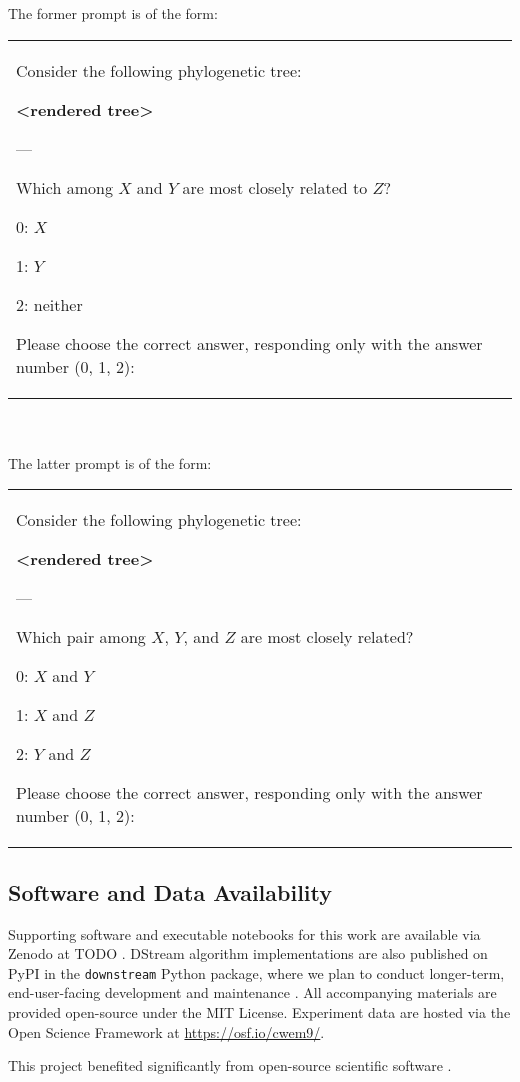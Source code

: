 The former prompt is of the form:

\begin{tabular}{|p{}}
Consider the following phylogenetic tree:

\textbf{<rendered tree>}

---

Which among $X$ and $Y$ are most closely related to $Z$?

0: $X$

1: $Y$

2: neither

Please choose the correct answer, responding only with the answer number (0, 1, 2):
\end{tabular}

~\\
~\\
The latter prompt is of the form:

\begin{tabular}{|p{}}
Consider the following phylogenetic tree:

\textbf{<rendered tree>}

---

Which pair among $X$, $Y$, and $Z$ are most closely related?

0: $X$ and $Y$

1: $X$ and $Z$

2: $Y$ and $Z$

Please choose the correct answer, responding only with the answer number (0, 1, 2):
\end{tabular}

\subsection{Software and Data Availability} \label{sec:materials}

Supporting software and executable notebooks for this work are available via Zenodo at TODO \citep{moreno2024hsurf}.
DStream algorithm implementations are also published on PyPI in the \texttt{downstream} Python package, where we plan to conduct longer-term, end-user-facing development and maintenance \citep{moreno2024downstream}.
All accompanying materials are provided open-source under the MIT License.
Experiment data are hosted via the Open Science Framework at \url{https://osf.io/cwem9/}.

This project benefited significantly from open-source scientific software \citep{2020SciPy-NMeth,harris2020array,reback2020pandas,mckinney-proc-scipy-2010,waskom2021seaborn,hunter2007matplotlib,moreno2023teeplot}.
